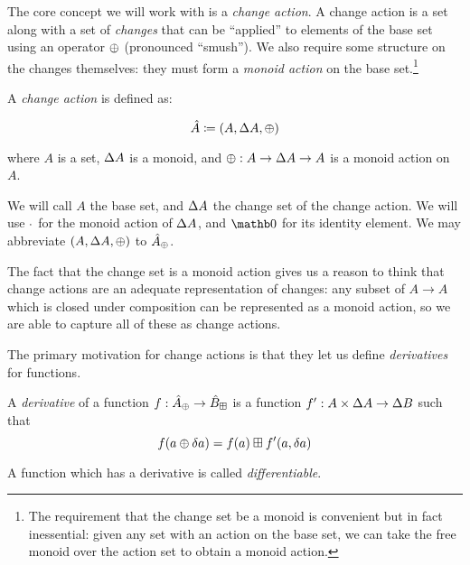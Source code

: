 The core concept we will work with is a \emph{change action}. A change action is
a set along with a set of \emph{changes} that can be ``applied'' to elements of
the base set using an operator $\oplus$ (pronounced ``smush''). We also require
some structure on the changes themselves: they must form a \emph{monoid action}
on the base set.\footnote{The requirement that the change set be a monoid is convenient but in
  fact inessential: given any set with an action on the base set, we can take the
  free monoid over the action set to obtain a monoid action.}

\begin{defn}
  A \emph{change action} is defined as:

  \begin{displaymath}
    \hat{A} \coloneqq (A,\Delta A,\oplus)
  \end{displaymath}

  where $A$ is a set, $\Delta A$ is a monoid, and $\oplus : A \rightarrow
  \Delta A \rightarrow A$ is a monoid action on $A$.

  We will call $A$ the base set, and $\Delta A$ the change set of the change
  action. We will use $\cdot$ for the monoid action of $\Delta A$, and
  $\mzero$ for its identity element. We may abbreviate $(A,\Delta A,\oplus)$ to $\hat{A}_\oplus$.
\end{defn}

The fact that the change set is a monoid action gives us a reason to think that
change actions are an adequate representation of changes: any subset of $A
\rightarrow A$ which is closed under composition can be
represented as a monoid action, so we are able to capture all of these as change actions.

The primary motivation for change actions is that they let us define
\emph{derivatives} for functions.

\begin{defn}[Derivatives]
  \label{def:derivative}
  A \emph{derivative} of a function $f: \hat{A}_\oplus \rightarrow \hat{B}_\boxplus$ is a function $f': A \times \Delta A \rightarrow
  \Delta B$ such that
  \begin{displaymath}
    f(a \oplus \delta a) = f(a) \boxplus f'(a, \delta a)
  \end{displaymath}

  A function which has a derivative is called \emph{differentiable}.
\end{defn}

